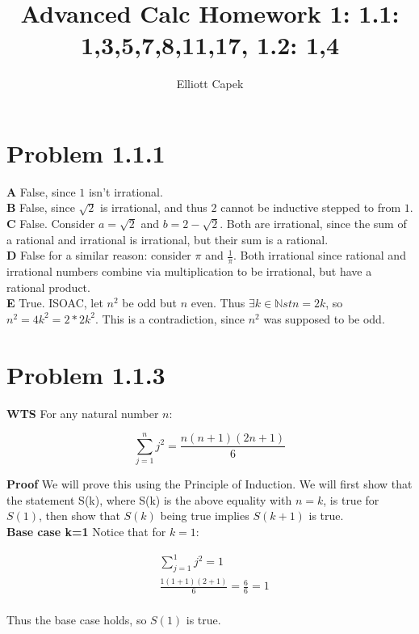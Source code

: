\documentclass[10pt]{article} %
\title{Advanced Calc Homework \large 1: 1.1: 1,3,5,7,8,11,17, 1.2: 1,4}
\author{Elliott Capek}
\begin{document}
\maketitle{}

\section{Problem 1.1.1}
\textbf{A} False, since $1$ isn't irrational.\\
\textbf{B} False, since $\sqrt{2}$ is irrational, and thus $2$ cannot be inductive stepped to from $1$.\\
\textbf{C} False. Consider $a = \sqrt{2}$ and $b = 2 - \sqrt{2}$. Both are irrational, since the sum of a rational and irrational is irrational, but their sum is a rational.\\
\textbf{D} False for a similar reason: consider $\pi$ and $\frac{1}{\pi}$. Both irrational since rational and irrational numbers combine via multiplication to be irrational, but have a rational product.\\
\textbf{E} True. ISOAC, let $n^2$ be odd but $n$ even. Thus $\exists k\in\mathbb{N} st n=2k$, so $n^2 = 4k^2 = 2*2k^2$. This is a contradiction, since $n^2$ was supposed to be odd.\\

\section{Problem 1.1.3}
\textbf{WTS} For any natural number $n$:

\begin{equation*}
  \sum_{j=1}^{n} j^2 = \frac{n(n+1)(2n+1)}{6}
\end{equation*}

\textbf{Proof}
We will prove this using the Principle of Induction. We will first show that the statement S(k), where S(k) is the above equality with $n=k$, is true for $S(1)$, then show that $S(k)$ being true implies $S(k+1)$ is true.\\

\textbf{Base case k=1}
Notice that for $k=1$:

\begin{align*}
  &\sum_{j=1}^{1} j^2 = 1\\
  &\frac{1(1+1)(2+1)}{6} = \frac66 = 1\\
\end{align*}

Thus the base case holds, so $S(1)$ is true.\\
\end{document}
